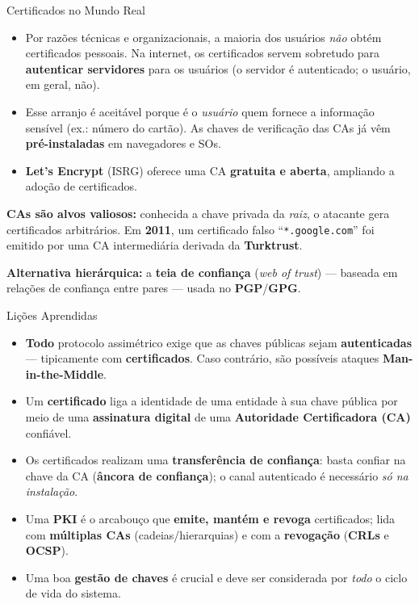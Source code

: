 \documentclass{beamer}
\begin{document}
\begin{frame}{Certificados no Mundo Real}
    \begin{itemize}
        \footnotesize
        \item Por razões técnicas e organizacionais, a maioria dos usuários \emph{não} obtém certificados pessoais. Na internet, os certificados servem sobretudo para \textbf{autenticar servidores} para os usuários (o servidor é autenticado; o usuário, em geral, não).
        \item Esse arranjo é aceitável porque é o \emph{usuário} quem fornece a informação sensível (ex.: número do cartão). As chaves de verificação das CAs já vêm \textbf{pré-instaladas} em navegadores e SOs.
        \item \textbf{Let's Encrypt} (ISRG) oferece uma CA \textbf{gratuita e aberta}, ampliando a adoção de certificados.
    \end{itemize}
    \medskip
    \begin{tcolorbox}[colback=red!5,colframe=red!60!black,boxrule=0.5pt]
        \footnotesize
        \textbf{CAs são alvos valiosos:} conhecida a chave privada da \emph{raiz}, o atacante gera certificados arbitrários. Em \textbf{2011}, um certificado falso ``\texttt{*.google.com}'' foi emitido por uma CA intermediária derivada da \textbf{Turktrust}.
    \end{tcolorbox}
    \medskip
    {\footnotesize \textbf{Alternativa hierárquica:} a \textbf{teia de confiança} (\textit{web of trust}) --- baseada em relações de confiança entre pares --- usada no \textbf{PGP}/\textbf{GPG}.}
\end{frame}

\begin{frame}{Lições Aprendidas}
    \begin{itemize}
        \item \textbf{Todo} protocolo assimétrico exige que as chaves públicas sejam \textbf{autenticadas} --- tipicamente com \textbf{certificados}. Caso contrário, são possíveis ataques \textbf{Man-in-the-Middle}.
        \medskip
        \item Um \textbf{certificado} liga a identidade de uma entidade à sua chave pública por meio de uma \textbf{assinatura digital} de uma \textbf{Autoridade Certificadora (CA)} confiável.
        \medskip
        \item Os certificados realizam uma \textbf{transferência de confiança}: basta confiar na chave da CA (\textbf{âncora de confiança}); o canal autenticado é necessário \emph{só na instalação}.
        \medskip
        \item Uma \textbf{PKI} é o arcabouço que \textbf{emite, mantém e revoga} certificados; lida com \textbf{múltiplas CAs} (cadeias/hierarquias) e com a \textbf{revogação} (\textbf{CRLs} e \textbf{OCSP}).
        \medskip
        \item Uma boa \textbf{gestão de chaves} é crucial e deve ser considerada por \emph{todo} o ciclo de vida do sistema.
    \end{itemize}
\end{frame}
\end{document}
